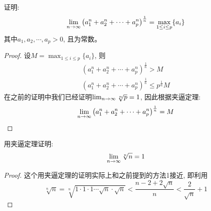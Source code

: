 \begin{example}
    证明:
    \begin{equation*}
        \lim_{n \to \infty } \left( a_1^n + a_2^n + \cdots + a_p^n \right)^\frac{1}{n} = \max_{1 \le i \le p}\{a_i\}
    \end{equation*}
    其中$a_1, a_2, \cdots, a_p > 0$, 且为常数。
\end{example}
\begin{proof}
    \def\tmp{\left(a_1^n + a_2^n + \cdots + a_p^n\right)^{\frac{1}{n}}}
    设$M = \max_{1 \le i \le p}\{a_i\}$, 则
    \begin{equation*}
        \begin{aligned}
            \tmp > M \\
            \tmp \le p^{\frac{1}{n}}M 
        \end{aligned}
    \end{equation*}
    在之前的证明中我们已经证明$\lim_{n \to \infty } \sqrt[n]{p} = 1$, 因此根据夹逼定理:
    \begin{equation*}
        \mylim{n}{\tmp} = M
    \end{equation*}

\end{proof}

\begin{example}
    用夹逼定理证明:
    \begin{equation*}
        \lim_{n \to \infty } \sqrt[n]{n} = 1
    \end{equation*}
\end{example}
\begin{proof}
    这个用夹逼定理的证明实际上和之前提到的方法1接近, 即利用
    \begin{equation*}
        \sqrt[n]{n} = \sqrt[n]{1\cdot1\cdot1\cdots\sqrt{n}\cdot\sqrt{n}} <\frac{n-2+2\sqrt{n}}{n} < \frac{2}{\sqrt{n}} + 1
    \end{equation*}
\end{proof}

